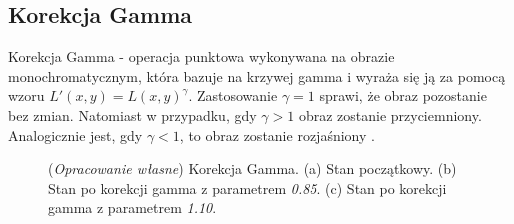 \documentclass{article}
\begin{document}
        \subsection{Korekcja Gamma}
        {
            \label{sec:korekcja-gamma}
            \Large
            \justifying
            \quad
            Korekcja Gamma - operacja punktowa wykonywana na obrazie monochromatycznym, która bazuje na krzywej gamma i wyraża się ją za pomocą wzoru \(L'(x,y) = L(x,y)^\gamma\).
            Zastosowanie \(\gamma = 1\) sprawi, że obraz pozostanie bez zmian.
            Natomiast w przypadku, gdy \(\gamma > 1\) obraz zostanie przyciemniony.
            Analogicznie jest, gdy \(\gamma < 1\), to obraz zostanie rozjaśniony \cite{Digital Image Processing Second Edition}.
        }
        \begin{figure}[H]
            \centering
            \qquad
            \qquad
            \caption
            {
                (\textit{Opracowanie własne}) Korekcja Gamma.
                (a) Stan początkowy.
                (b) Stan po korekcji gamma z parametrem \textit{0.85}.
                (c) Stan po korekcji gamma z parametrem \textit{1.10}.
            }
            \label{Korekcja_Gamma}
        \end{figure}
\end{document}
